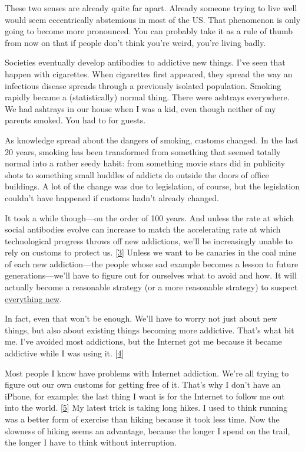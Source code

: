 These two senses are already quite far apart. Already someone trying to
live well would seem eccentrically abstemious in most of the US. That
phenomenon is only going to become more pronounced. You can probably
take it as a rule of thumb from now on that if people don't think you're
weird, you're living badly.

Societies eventually develop antibodies to addictive new things. I've
seen that happen with cigarettes. When cigarettes first appeared, they
spread the way an infectious disease spreads through a previously
isolated population. Smoking rapidly became a (statistically) normal
thing. There were ashtrays everywhere. We had ashtrays in our house when
I was a kid, even though neither of my parents smoked. You had to for
guests.

As knowledge spread about the dangers of smoking, customs changed. In
the last 20 years, smoking has been transformed from something that
seemed totally normal into a rather seedy habit: from something movie
stars did in publicity shots to something small huddles of addicts do
outside the doors of office buildings. A lot of the change was due to
legislation, of course, but the legislation couldn't have happened if
customs hadn't already changed.

It took a while though---on the order of 100 years. And unless the rate
at which social antibodies evolve can increase to match the accelerating
rate at which technological progress throws off new addictions, we'll be
increasingly unable to rely on customs to protect us.
{[}\hyperref[f3n]{3}{]} Unless we want to be canaries in the coal mine
of each new addiction---the people whose sad example becomes a lesson to
future generations---we'll have to figure out for ourselves what to
avoid and how. It will actually become a reasonable strategy (or a more
reasonable strategy) to suspect
\href{http://en.wikipedia.org/wiki/Paleolithic_diet}{everything new}.

In fact, even that won't be enough. We'll have to worry not just about
new things, but also about existing things becoming more addictive.
That's what bit me. I've avoided most addictions, but the Internet got
me because it became addictive while I was using it.
{[}\hyperref[f4n]{4}{]}

Most people I know have problems with Internet addiction. We're all
trying to figure out our own customs for getting free of it. That's why
I don't have an iPhone, for example; the last thing I want is for the
Internet to follow me out into the world. {[}\hyperref[f5n]{5}{]} My
latest trick is taking long hikes. I used to think running was a better
form of exercise than hiking because it took less time. Now the slowness
of hiking seems an advantage, because the longer I spend on the trail,
the longer I have to think without interruption.

